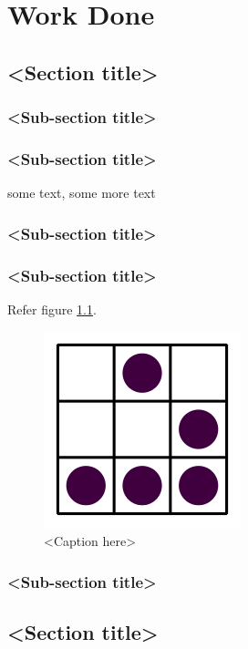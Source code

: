 \chapter{Work Done}

\section{<Section title>}

\subsection{<Sub-section title>}

\subsection{<Sub-section title>}
some text\cite{citation-2-name-here}, some more text
\subsection{<Sub-section title>}

\subsection{<Sub-section title>}

Refer figure \ref{fig:label}.

\begin{figure}[htb]
\centering
\includegraphics[scale=0.3]{./pictures/glider} %
\caption{<Caption here>}
\label{fig:label} %
\end{figure}

\subsection{<Sub-section title>}


\section{<Section title>}

%